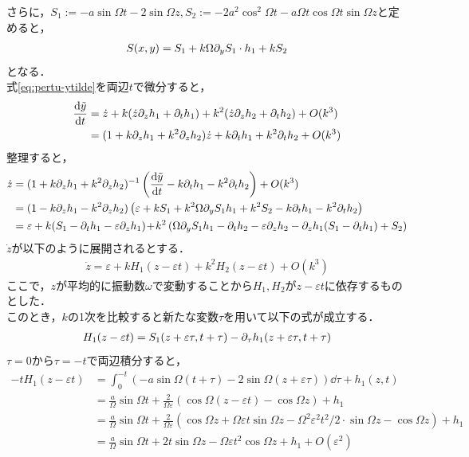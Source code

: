 \documentclass[../main]{subfiles}
\begin{document}
    さらに，$S_1:=-a\sin\Omega t-2\sin\Omega z,S_2:=-2a^2\cos^2\Omega t-a\Omega t\cos \Omega t\sin \Omega z$と定めると，
    \begin{align*}
        S(x,y)=S_1+k\Omega\partial_y S_1\cdot h_1+kS_2
    \end{align*}
    となる．\\
    式\eqref{eq:pertu-ytilde}を両辺$t$で微分すると，
    \begin{align*}
        \dv{\tilde{y}}{t}&=\dot{z}+k(\dot{z}\partial_zh_1+\partial_th_1)+k^2(\dot{z}\partial_zh_2+\partial_th_2)+O(k^3)\\
        &=(1+k\partial_zh_1+k^2\partial_zh_2)\dot{z}+k\partial_th_1+k^2\partial_th_2+O(k^3)
    \end{align*}
    整理すると，
    \begin{align*}
        \dot{z}&=(1+k\partial_zh_1+k^2\partial_zh_2)^{-1}\left( \dv{\tilde{y}}{t}-k\partial_th_1-k^2\partial_th_2 \right)+O(k^3)\\
        &=(1-k\partial_zh_1-k^2\partial_zh_2)\left(\varepsilon+kS_1+k^2\Omega \partial_y S_1h_1+k^2S_2-k\partial_th_1-k^2\partial_th_2 \right)\\
        &=\varepsilon+k(S_1-\partial_th_1-\varepsilon\partial_zh_1)\!+\!k^2\left(\Omega \partial_y S_1h_1 -\partial_th_2-\varepsilon\partial_zh_2 -\partial_zh_1(S_1-\partial_th_1)+S_2\right)
    \end{align*}
    $\dot{z}$が以下のように展開されるとする．
    \begin{align*}
        \dot{z}=\varepsilon+kH_1(z-\varepsilon t)+k^2H_2(z-\varepsilon t)+O(k^3)
    \end{align*}
    ここで，$z$が平均的に振動数$\omega$で変動することから$H_1,H_2$が$z-\varepsilon t$に依存するものとした．\\
    このとき，$k$の1次を比較すると新たな変数$\tau$を用いて以下の式が成立する．
    \begin{align*}
        H_1(z-\varepsilon t)=S_1(z+\varepsilon\tau,t+\tau)-\partial_\tau h_1(z+\varepsilon\tau,t+\tau)
    \end{align*}
    $\tau=0$から$\tau=-t$で両辺積分すると，
    \begin{align}
        -tH_1(z-\varepsilon t)&=\int_0^{-t}\left(-a\sin\Omega(t+\tau)-2\sin\Omega(z+\varepsilon\tau)\right)\dd{\tau}+h_1(z,t)\\
        &=\frac{a}{\Omega}\sin\Omega t+\frac{2}{\Omega \varepsilon}(\cos \Omega (z-\varepsilon t)-\cos \Omega z)+h_1\\
        &=\frac{a}{\Omega}\sin\Omega t+\frac{2}{\Omega \varepsilon}(\cos \Omega z+\Omega \varepsilon t\sin \Omega z-\Omega^2\varepsilon^2t^2/2\cdot\sin \Omega z-\cos \Omega z)+h_1\\
        &=\frac{a}{\Omega}\sin\Omega t+2t\sin \Omega z-\Omega\varepsilon t^2\cos \Omega z+h_1+O(\varepsilon^2)
        \label{eq-h1-H1}
    \end{align}
\end{document}
